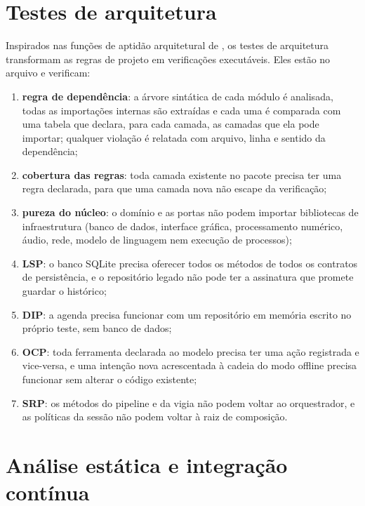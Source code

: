 \section{Testes de arquitetura}\label{sec:testes-arquitetura}

Inspirados nas funções de aptidão arquitetural de \textcite{ford2017}, os testes de arquitetura
transformam as regras de projeto em verificações executáveis. Eles estão no arquivo
 e verificam:

\begin{enumerate}[label=\alph*)]
  \item \textbf{regra de dependência}: a árvore sintática de cada módulo é analisada, todas as
        importações internas são extraídas e cada uma é comparada com uma tabela que declara, para cada
        camada, as camadas que ela pode importar; qualquer violação é relatada com arquivo, linha e
        sentido da dependência;
  \item \textbf{cobertura das regras}: toda camada existente no pacote precisa ter uma regra declarada,
        para que uma camada nova não escape da verificação;
  \item \textbf{pureza do núcleo}: o domínio e as portas não podem importar bibliotecas de
        infraestrutura (banco de dados, interface gráfica, processamento numérico, áudio, rede, modelo de
        linguagem nem execução de processos);
  \item \textbf{LSP}: o banco SQLite precisa oferecer todos os métodos de todos os contratos de
        persistência, e o repositório legado não pode ter a assinatura que promete guardar o histórico;
  \item \textbf{DIP}: a agenda precisa funcionar com um repositório em memória escrito no próprio teste,
        sem banco de dados;
  \item \textbf{OCP}: toda ferramenta declarada ao modelo precisa ter uma ação registrada e vice-versa, e
        uma intenção nova acrescentada à cadeia do modo offline precisa funcionar sem alterar o código
        existente;
  \item \textbf{SRP}: os métodos do pipeline e da vigia não podem voltar ao orquestrador, e as políticas
        da sessão não podem voltar à raiz de composição.
\end{enumerate}

\section{Análise estática e integração contínua}

